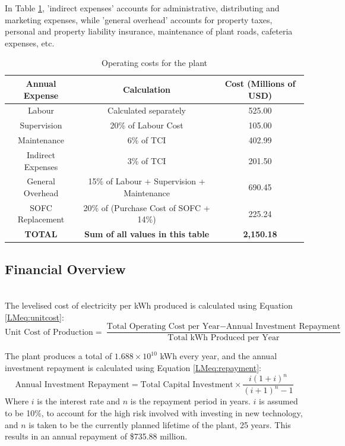 In Table \ref{LMtable:opcosts}, 'indirect expenses' accounts for administrative, distributing and marketing expenses, while 'general overhead' accounts for property taxes, personal and property liability insurance, maintenance of plant roads, cafeteria expenses, etc.


\begin{table}[h]
\centering
\caption{Operating costs for the plant}
\label{LMtable:opcosts}
\begin{tabular}{|c|c|c|}
\hline
\textbf{Annual Expense} & \textbf{Calculation}                       & \textbf{Cost (Millions of USD)} \\ \hline
Labour                  & Calculated separately                      & 525.00           \\ \hline
Supervision             & 20\% of Labour Cost                        & 105.00           \\ \hline
Maintenance             & 6\% of TCI                                 & 402.99           \\ \hline
Indirect Expenses       & 3\% of TCI                                 & 201.50           \\ \hline
General Overhead        & 15\% of Labour + Supervision + Maintenance & 690.45           \\ \hline
SOFC Replacement        & 20\% of (Purchase Cost of SOFC + 14\%)     & 225.24           \\ \hline
\textbf{TOTAL}          & \textbf{Sum of all values in this table}   & \textbf{2,150.18} \\ \hline
\end{tabular}
\end{table}



\subsection{Financial Overview}
\hspace{1cm}\\
The levelised cost of electricity per kWh produced is calculated using Equation \ref{LMeq:unitcost}:
\begin{equation}
    \text{Unit Cost of Production} = \frac{\text{Total Operating Cost per Year} - \text{Annual Investment Repayment}}{\text{Total kWh Produced per Year}}
    \label{LMeq:unitcost}
\end{equation}

The plant produces a total of $\text{1.688} \times \text{10}^{\text{10}}$ kWh every year, and the annual investment repayment is calculated using Equation \ref{LMeq:repayment}:
\begin{equation}
    \text{Annual Investment Repayment} = \text{Total Capital Investment}\times\frac{i(1+i)^{n}}{(i+1)^{n} - 1}
    \label{LMeq:repayment}
\end{equation}
Where $i$ is the interest rate and $n$ is the repayment period in years. $i$ is assumed to be 10\%, to account for the high risk involved with investing in new technology, and $n$ is taken to be the currently planned lifetime of the plant, 25 years. This results in an annual repayment of \$735.88 million.
\\

